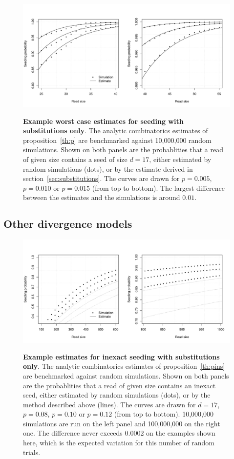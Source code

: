 \documentclass{article}
\begin{document}
\begin{figure}[h]
\centering
\includegraphics[scale=0.445]{simulp_short.pdf}
\label{fig:simulp_short}
\caption{\textbf{Example worst case estimates for seeding with
substitutions only}. The analytic combinatorics estimates of
proposition~\ref{th:p} are benchmarked against 10,000,000 random
simulations. Shown on both panels are the probablities that a read of
given size contains a seed of size $d=17$, either estimated by random
simulations (dots), or by the estimate derived in
section~\ref{sec:substitutions}. The curves are drawn for $p=0.005$,
$p=0.010$ or $p=0.015$ (from top to bottom). The largest difference
between the estimates and the simulations is around $0.01$.}
\end{figure}

\subsection{Other divergence models}

\begin{figure}[h]
\centering
\includegraphics[scale=0.445]{simulp_approx.pdf}
\label{fig:simulp_approx}
\caption{\textbf{Example estimates for inexact seeding with substitutions
only}. The analytic combinatorics estimates of proposition~\ref{th:pins}
are benchmarked against random simulations.  Shown on both panels are the
probablities that a read of given size contains an inexact seed, either
estimated by random simulations (dots), or by the method described above
(lines). The curves are drawn for $d=17$, $p=0.08$, $p=0.10$ or $p=0.12$
(from top to bottom). 10,000,000 simulations are run on the left panel and
100,000,000 on the right one.  The difference never exceeds 0.0002 on the
examples shown here, which is the expected variation for this number of
random trials.}
\end{figure}
\end{document}
